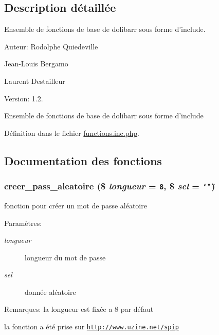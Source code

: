 \subsection{Description d\'{e}taill\'{e}e}
Ensemble de fonctions de base de dolibarr sous forme d'include. 

\begin{Desc}
\item[Auteur:]Rodolphe Quiedeville 

Jean-Louis Bergamo 

Laurent Destailleur \end{Desc}
\begin{Desc}
\item[Version:]1.2.\end{Desc}
Ensemble de fonctions de base de dolibarr sous forme d'include

D\'{e}finition dans le fichier \hyperlink{functions_8inc_8php-source}{functions.inc.php}.

\subsection{Documentation des fonctions}
\hypertarget{functions_8inc_8php_a45}{
\subsubsection[creer\_\-pass\_\-aleatoire]{\setlength{\rightskip}{0pt plus 5cm}creer\_\-pass\_\-aleatoire (\$ {\em longueur} = {\tt 8}, \$ {\em sel} = {\tt \char`\"{}\char`\"{}})}}
\label{functions_8inc_8php_a45}


fonction pour cr\'{e}er un mot de passe al\'{e}atoire 

\begin{Desc}
\item[Param\`{e}tres:]
\begin{description}
\item[{\em longueur}]longueur du mot de passe \item[{\em sel}]donn\'{e}e al\'{e}atoire \end{description}
\end{Desc}
\begin{Desc}
\item[Remarques:]la longueur est fix\'{e}e a 8 par d\'{e}faut 

la fonction a \'{e}t\'{e} prise sur \href{http://www.uzine.net/spip}{\tt http://www.uzine.net/spip} \end{Desc}


